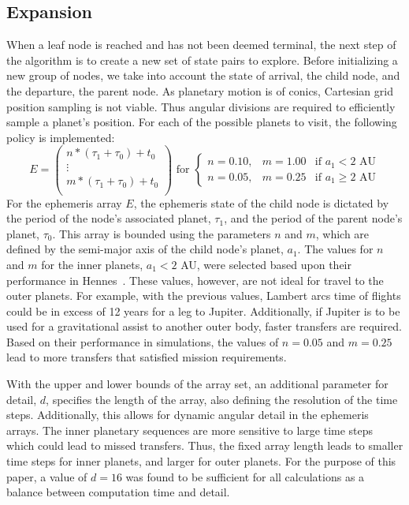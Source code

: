 \documentclass[letterpaper, preprint, paper,11pt]{AAS}	%
\begin{document}
\subsection{Expansion}
When a leaf node is reached and has not been deemed terminal, the next step of the algorithm is to create a new set of state pairs to explore. Before initializing a new group of nodes, we take into account the state of arrival, the child node, and the departure, the parent node. As planetary motion is of conics, Cartesian grid position sampling is not viable. Thus angular divisions are required to efficiently sample a planet's position. For each of the possible planets to visit, the following policy is implemented:
\begin{equation*}
    \label{eq:ephemArray}
    E =
    \left(\begin{array}{c}
        n*(\tau_1 + \tau_0) + t_0 \\
        \vdots \\
        m*(\tau_1 + \tau_0) + t_0 \\
    \end{array}\right)
    \text{ for }
    \left\{\begin{array}{lll}
        n = 0.10, & m = 1.00 &\text{if } a_1 < 2 \text{ AU} \\
        n = 0.05, & m = 0.25 &\text{if } a_1 \geq 2 \text{ AU}
    \end{array}\right.
\end{equation*}
For the ephemeris array $E$, the ephemeris state of the child node is dictated by the period of the node's associated planet, $\tau_1$, and the period of the parent node's planet, $\tau_0$. This array is bounded using the parameters $n$ and $m$, which are defined by the semi-major axis of the child node's planet, $a_1$. The values for $n$ and $m$ for the inner planets, $a_1 < 2$ AU, were selected based upon their performance in Hennes~\cite{Hennes2015}. These values, however, are not ideal for travel to the outer planets. For example, with the previous values, Lambert arcs time of flights could be in excess of 12 years for a leg to Jupiter. Additionally, if Jupiter is to be used for a gravitational assist to another outer body, faster transfers are required. Based on their performance in simulations, the values of $n = 0.05$ and $m = 0.25$ lead to more transfers that satisfied mission requirements.

With the upper and lower bounds of the array set, an additional parameter for detail, $d$, specifies the length of the array, also defining the resolution of the time steps. Additionally, this allows for dynamic angular detail in the ephemeris arrays. The inner planetary sequences are more sensitive to large time steps which could lead to missed transfers. Thus, the fixed array length leads to smaller time steps for inner planets, and larger for outer planets. For the purpose of this paper, a value of $d = 16$ was found to be sufficient for all calculations as a balance between computation time and detail.
\end{document}
